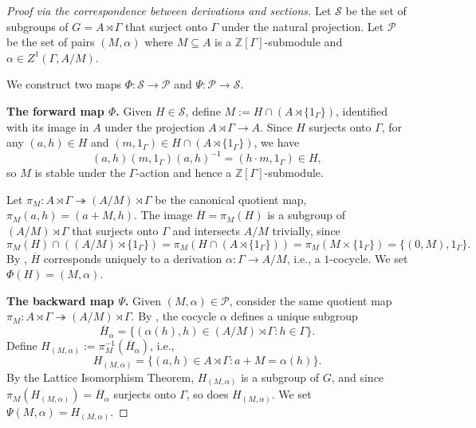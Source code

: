 \begin{proof}[Proof via the correspondence between derivations and sections]
    Let $\mathcal{S}$ be the set of subgroups of $G = A \rtimes \Gamma$ that surject onto $\Gamma$ under the natural projection. Let $\mathcal{P}$ be the set of pairs $(M, \alpha)$ where $M \subseteq A$ is a $\mathbb{Z}[\Gamma]$-submodule and $\alpha \in Z^1(\Gamma, A/M)$.

    We construct two maps $\Phi: \mathcal{S} \to \mathcal{P}$ and $\Psi: \mathcal{P} \to \mathcal{S}$.

    \textbf{The forward map $\Phi$.} Given $H \in \mathcal{S}$, define $M := H \cap (A \rtimes \{1_\Gamma\})$, identified with its image in $A$ under the projection $A \rtimes \Gamma \to A$. Since $H$ surjects onto $\Gamma$, for any $(a,h) \in H$ and $(m,1_\Gamma) \in H \cap (A \rtimes \{1_\Gamma\})$, we have
    $$(a,h)(m,1_\Gamma)(a,h)^{-1} = (h \cdot m, 1_\Gamma) \in H,$$
    so $M$ is stable under the $\Gamma$-action and hence a $\mathbb{Z}[\Gamma]$-submodule.

    Let $\pi_M: A \rtimes \Gamma \twoheadrightarrow (A/M) \rtimes \Gamma$ be the canonical quotient map, $\pi_M(a,h) = (a + M, h)$. The image $\overline{H} = \pi_M(H)$ is a subgroup of $(A/M) \rtimes \Gamma$ that surjects onto $\Gamma$ and intersects $A/M$ trivially, since
    $$\pi_M(H) \cap ((A/M) \rtimes \{1_\Gamma\}) = \pi_M(H \cap (A \rtimes \{1_\Gamma\})) = \pi_M(M \times \{1_\Gamma\}) = \{(0,M), 1_\Gamma\}.$$
    By , $\overline{H}$ corresponds uniquely to a derivation $\alpha: \Gamma \to A/M$, i.e., a $1$-cocycle. We set $\Phi(H) = (M, \alpha)$.

    \textbf{The backward map $\Psi$.} Given $(M, \alpha) \in \mathcal{P}$, consider the same quotient map $\pi_M: A \rtimes \Gamma \twoheadrightarrow (A/M) \rtimes \Gamma$. By , the cocycle $\alpha$ defines a unique subgroup
    $$\overline{H}_\alpha = \{ (\alpha(h), h) \in (A/M) \rtimes \Gamma : h \in \Gamma \}.$$
    Define $H_{(M,\alpha)} := \pi_M^{-1}(\overline{H}_\alpha)$, i.e.,
    $$H_{(M,\alpha)} = \{ (a,h) \in A \rtimes \Gamma : a + M = \alpha(h) \}.$$
    By the Lattice Isomorphism Theorem, $H_{(M,\alpha)}$ is a subgroup of $G$, and since $\pi_M(H_{(M,\alpha)}) = \overline{H}_\alpha$ surjects onto $\Gamma$, so does $H_{(M,\alpha)}$. We set $\Psi(M, \alpha) = H_{(M,\alpha)}$.


\end{proof}
